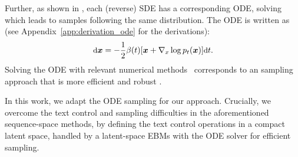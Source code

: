 \documentclass[11pt]{article}
\begin{document}
Further, as shown in \citep{DBLP:conf/iclr/0011SKKEP21,DBLP:journals/entropy/MaoutsaRO20}, each (reverse) SDE has a corresponding ODE, solving which leads to samples following the same distribution. The ODE is written as (see Appendix~\ref{app:derivation_ode} for the derivations):
\begin{equation}
\small
\setlength\abovedisplayskip{0.2cm}
\setlength\belowdisplayskip{0.2cm}
    \label{eq:ode_x}
    \text{d}\bm x=-\frac{1}{2}\beta(t)[\bm x+\nabla_x\log p_t(\bm x)]\text{d}t.
\end{equation}
Solving the ODE with relevant numerical methods~\cite{euler1824institutionum,calvo1990fifth,engstler1997mur8} corresponds to an sampling approach that is more efficient and robust \citep{DBLP:conf/iclr/0011SKKEP21,nie2021controllable}.

In this work, we adapt the ODE sampling for our approach. Crucially, we overcome the text control and sampling difficulties in the aforementioned sequence-space methods, by defining the text control operations in a compact latent space, handled by a latent-space EBMs with the ODE solver for efficient sampling.
\end{document}
